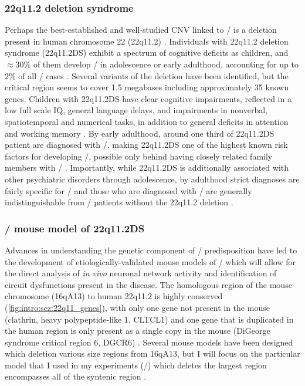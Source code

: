 \subsubsection{22q11.2 deletion syndrome}
\label{sec:intro:scz:22q11}
Perhaps the best-established and well-studied CNV linked to \scz/ is a deletion present in human chromosome 22 (22q11.2) \citep{Karayiorgou1995, Chow2006, Karayiorgou2010}.
Individuals with 22q11.2 deletion syndrome (22q11.2DS) exhibit a spectrum of cognitive deficits as children, and $\approx$30\% of them develop \scz/ in adolescence or early adulthood, accounting for up to 2\% of all \scz/ cases \citep{Stark2008}.
Several variants of the deletion have been identified, but the critical region seems to cover 1.5 megabases including approximately 35 known genes.
Children with 22q11.2DS have clear cognitive impairments, reflected in a low full scale IQ, general language delays, and impairments in nonverbal, spatiotemporal and numerical tasks, in addition to general deficits in attention and working memory \citep{Karayiorgou2010}.
By early adulthood, around one third of 22q11.2DS patient are diagnosed with \scz/, making 22q11.2DS one of the highest known risk factors for developing \scz/, possible only behind having closely related family members with \scz/ \citep{Murphy1999}.
Importantly, while 22q11.2DS is additionally associated with other psychiatric disorders through adolescence, by adulthood strict diagnoses are fairly specific for \scz/ and those who are diagnosed with \scz/ are generally indistinguishable from \scz/ patients without the 22q11.2 deletion \citep{Karayiorgou2010}.

\subsubsection{\df/ mouse model of 22q11.2DS}
\label{sec:intro:scz:df}
Advances in understanding the genetic component of \scz/ predisposition have led to the development of etiologically-validated mouse models of \scz/ which will allow for the direct analysis of \emph{in vivo} neuronal network activity and identification of circuit dysfunctions present in the disease.
The homologous region of the mouse chromosome (16qA13) to human 22q11.2 is highly conserved (\autoref{fig:intro:scz:22q11_genes}), with only one gene not present in the mouse (clathrin, heavy polypeptide-like 1, CLTCL1) and one gene that is duplicated in the human region is only present as a single copy in the mouse (DiGeorge syndrome critical region 6, DGCR6) \citep{Karayiorgou2010}.
Several mouse models have been designed which deletion various size regions from 16qA13, but I will focus on the particular model that I used in my experiments (\df/) which deletes the largest region encompasses all of the syntenic region \citep{Stark2008}.

